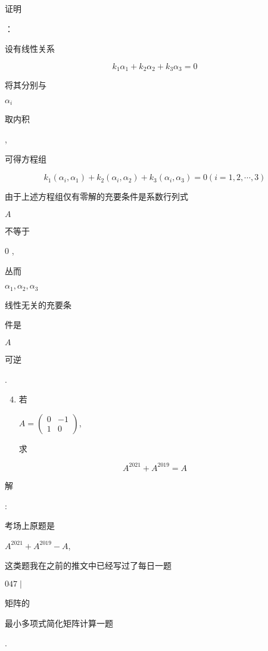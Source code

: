 \documentclass[10pt]{article}
\begin{document}
\begin{CJK}{UTF8}{mj}证明\end{CJK}：\begin{CJK}{UTF8}{mj}设有线性关系\end{CJK}
$$
k_{1} \alpha_{1}+k_{2} \alpha_{2}+k_{3} \alpha_{3}=0
$$
\begin{CJK}{UTF8}{mj}将其分别与\end{CJK} $\alpha_{i}$ \begin{CJK}{UTF8}{mj}取内积\end{CJK}, \begin{CJK}{UTF8}{mj}可得方程组\end{CJK}
$$
k_{1}\left(\alpha_{i}, \alpha_{1}\right)+k_{2}\left(\alpha_{i}, \alpha_{2}\right)+k_{3}\left(\alpha_{i}, \alpha_{3}\right)=0(i=1,2, \cdots, 3)
$$
\begin{CJK}{UTF8}{mj}由于上述方程组仅有零解的充要条件是系数行列式\end{CJK} $A$ \begin{CJK}{UTF8}{mj}不等于\end{CJK} 0 , \begin{CJK}{UTF8}{mj}丛而\end{CJK} $\alpha_{1}, \alpha_{2}, \alpha_{3}$ \begin{CJK}{UTF8}{mj}线性无关的充要条\end{CJK} \begin{CJK}{UTF8}{mj}件是\end{CJK} $A$ \begin{CJK}{UTF8}{mj}可逆\end{CJK}.

\begin{enumerate}
  \setcounter{enumi}{3}
  \item \begin{CJK}{UTF8}{mj}若\end{CJK} $A=\left(\begin{array}{rr}0 & -1 \\ 1 & 0\end{array}\right)$, \begin{CJK}{UTF8}{mj}求\end{CJK}
\end{enumerate}
$$
A^{2021}+A^{2019}=A
$$
\begin{CJK}{UTF8}{mj}解\end{CJK}: \begin{CJK}{UTF8}{mj}考场上原题是\end{CJK} $A^{2021}+A^{2019}-A$, \begin{CJK}{UTF8}{mj}这类题我在之前的推文中已经写过了每日一题\end{CJK} $047 \mid$ \begin{CJK}{UTF8}{mj}矩阵的\end{CJK} \begin{CJK}{UTF8}{mj}最小多项式简化矩阵计算一题\end{CJK}.
\end{document}
